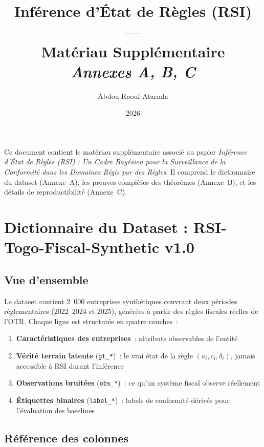 \documentclass[letterpaper]{article}
\title{%
\textbf{Inf\'erence d'\'Etat de R\`egles (RSI) ---}\\
\textbf{Mat\'eriau Suppl\'ementaire}\\[0.4em]
\large\textit{Annexes A, B, C}
}
\author{Abdou-Raouf Atarmla}
\date{2026}
\begin{document}
\maketitle
\thispagestyle{empty}

\noindent Ce document contient le mat\'eriau suppl\'ementaire associ\'e
au papier \emph{Inf\'erence d'\'Etat de R\`egles (RSI) : Un Cadre
Bay\'esien pour la Surveillance de la Conformit\'e dans les Domaines
R\'egis par des R\`egles}. Il comprend le dictionnaire du dataset
(Annexe~A), les preuves compl\`etes des th\'eor\`emes (Annexe~B), et
les d\'etails de reproductibilit\'e (Annexe~C).

\tableofcontents
\newpage

\appendix

\section{Dictionnaire du Dataset : RSI-Togo-Fiscal-Synthetic v1.0}
\label{app:dataset}

\subsection{Vue d'ensemble}

Le dataset contient 2~000 entreprises synth\'etiques couvrant deux
p\'eriodes r\'eglementaires (2022--2024 et 2025), g\'en\'er\'ees \`a
partir des r\`egles fiscales r\'eelles de l'OTR. Chaque ligne est
structur\'ee en quatre couches~:

\begin{enumerate}[leftmargin=2em]
  \item \textbf{Caract\'eristiques des entreprises}~: attributs
        observables de l'entit\'e
  \item \textbf{V\'erit\'e terrain latente} (\texttt{gt\_*})~: le
        vrai \'etat de la r\`egle $(a_i, c_i, \delta_i)$, jamais
        accessible \`a RSI durant l'inf\'erence
  \item \textbf{Observations bruit\'ees} (\texttt{obs\_*})~: ce
        qu'un syst\`eme fiscal observe r\'eellement
  \item \textbf{\'Etiquettes binaires} (\texttt{label\_*})~: labels
        de conformit\'e d\'eriv\'es pour l'\'evaluation des baselines
\end{enumerate}

\subsection{R\'ef\'erence des colonnes}
\end{document}
